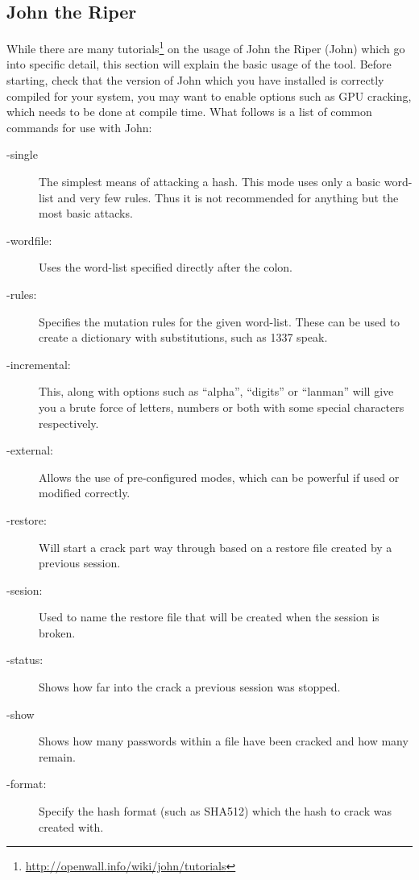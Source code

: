 		\subsection{John the Riper}
			While there are many tutorials\footnote{\url{http://openwall.info/wiki/john/tutorials}} on the usage of John the Riper (John) which go into specific detail, this section will explain the basic usage of the tool. 
			Before starting, check that the version of John which you have installed is correctly compiled for your system, you may want to enable options such as GPU cracking, which needs to be done at compile time. 
			What follows is a list of common commands for use with John:
			\begin{description}
				\item[-single]
					The simplest means of attacking a hash. 
					This mode uses only a basic word-list and very few rules. 
					Thus it is not recommended for anything but the most basic attacks. 
				\item[-wordfile:]
					Uses the word-list specified directly after the colon. 
				\item[-rules:]
					Specifies the mutation rules for the given word-list. 
					These can be used to create a dictionary with substitutions, such as 1337 speak. 
				\item[-incremental:]
					This, along with options such as ``alpha'', ``digits'' or ``lanman'' will give you a brute force of letters, numbers or both with some special characters respectively. 
				\item[-external:]
					Allows the use of pre-configured modes, which can be powerful if used or modified correctly. 
				\item[-restore:]
					Will start a crack part way through based on a restore file created by a previous session. 
				\item[-sesion:]
					Used to name the restore file that will be created when the session is broken. 
				\item[-status:]
					Shows how far into the crack a previous session was stopped. 
				\item[-show]
					Shows how many passwords within a file have been cracked and how many remain. 
				\item[-format:]
					Specify the hash format (such as SHA512) which the hash to crack was created with. 
			\end{description}
			
